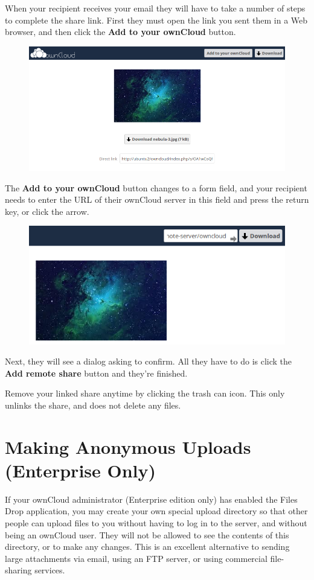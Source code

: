 \documentclass[letterpaper,10pt,english]{sphinxmanual}
\begin{document}
When your recipient receives your email they will have to take a number of
steps to complete the share link. First they must open the link you sent them in
a Web browser, and then click the \textbf{Add to your ownCloud} button.
\begin{figure}[htbp]
\centering

\includegraphics{create_public_share-8.png}
\end{figure}

The \textbf{Add to your ownCloud} button changes to a form field, and your recipient
needs to enter the URL of their ownCloud server in this field and press the
return key, or click the arrow.
\begin{figure}[htbp]
\centering

\includegraphics{create_public_share-9.png}
\end{figure}

Next, they will see a dialog asking to confirm. All they have to do is click
the \textbf{Add remote share} button and they're finished.

Remove your linked share anytime by clicking the trash can icon. This only
unlinks the share, and does not delete any files.


\section{Making Anonymous Uploads (Enterprise Only)}
\label{files/file_drop:making-anonymous-uploads-enterprise-only}\label{files/file_drop::doc}
If your ownCloud administrator (Enterprise edition only) has enabled the
Files Drop application, you may create your own special upload directory so that
other people can upload files to you without having to log in to the server, and
without being an ownCloud user. They will not be allowed to see the contents of
this directory, or to make any changes. This is an excellent alternative to
sending large attachments via email, using an FTP server, or using commercial
file-sharing services.
\end{document}
